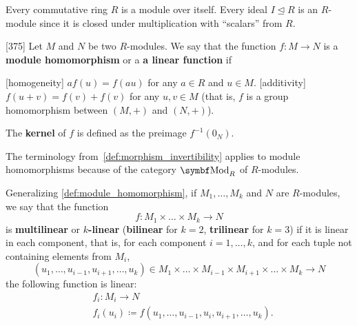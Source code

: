 \begin{example}\label{ex:module/ideal}
  Every commutative ring \( R \) is a module over itself. Every ideal \( I \unlhd R \) is an \( R \)-module since it is closed under multiplication with \enquote{scalars} from \( R \).
\end{example}

\begin{definition}\label{def:module_homomorphism}\cite{Knapp2016BAlg}[375]
  Let \( M \) and \( N \) be two \( R \)-modules. We say that the function \( f: M \to N \) is a \textbf{module homomorphism} or a \textbf{a linear function} if
  \begin{description}
    [homogeneity] \( a f(u) = f(a u) \) for any \( a \in R \) and \( u \in M \).
    [additivity] \( f(u + v) = f(v) + f(v) \) for any \( u, v \in M \) (that is, \( f \) is a group homomorphism between \( (M, +) \) and \( (N, +) \)).
  \end{description}

  The \textbf{kernel} of \( f \) is defined as the preimage \( f^{-1}(0_N) \).

  The terminology from~\cref{def:morphism_invertibility} applies to module homomorphisms because of the category \( \Bold{Mod}_R \) of \( R \)-modules.
\end{definition}

\begin{definition}\label{def:multilinear_function}
  Generalizing \cref{def:module_homomorphism}, if \( M_1, \ldots, M_k \) and \( N \) are \( R \)-modules, we say that the function
  \begin{equation*}
    f: M_1 \times \ldots \times M_k \to N
  \end{equation*}
  is \textbf{multilinear} or \textbf{\( k \)-linear} (\textbf{bilinear} for \( k = 2 \), \textbf{trilinear} for \( k = 3 \)) if it is linear in each component, that is, for each component \( i = 1, \ldots, k \), and for each tuple not containing elements from \( M_i \),
  \begin{equation*}
    (u_1, \ldots, u_{i-1}, u_{i+1}, \ldots, u_k) \in M_1 \times \ldots \times M_{i-1} \times M_{i+1} \times \ldots \times M_k \to N
  \end{equation*}
  the following function is linear:
  \begin{align*}
    &f_i: M_i \to N \\
    &f_i(u_i) \coloneqq f(u_1, \ldots, u_{i-1}, u_i, u_{i+1}, \ldots, u_k).
  \end{align*}
\end{definition}

